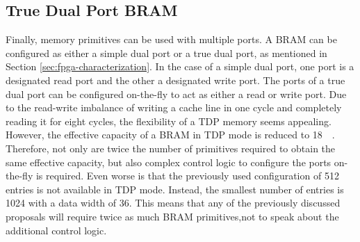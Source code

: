 



\subsection{True Dual Port BRAM}
Finally, memory primitives can be used with multiple ports. A BRAM can be configured as either a simple dual port or a true dual port, as mentioned in Section \ref{sec:fpga-characterization}. In the case of a simple dual port, one port is a designated read port and the other a designated write port. The ports of a true dual port can be configured on-the-fly to act as either a read or write port. Due to the read-write imbalance of writing a cache line in one cycle and completely reading it for eight cycles, the flexibility of a TDP memory seems appealing. However, the effective capacity of a BRAM in TDP mode is reduced to \SI{18}{\kilo\bit}. Therefore, not only are twice the number of primitives required to obtain the same effective capacity, but also complex control logic to configure the ports on-the-fly is required. Even worse is that the previously used configuration of 512 entries is not available in TDP mode. Instead, the smallest number of entries is 1024 with a data width of \SI{36}{\bit}. This means that any of the previously discussed proposals will require twice as much BRAM primitives,not to speak about the additional control logic.



